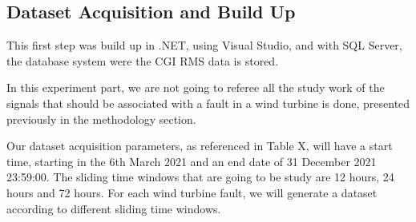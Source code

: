 \subsection{Dataset Acquisition and Build Up}
This first step was build up in .NET, using Visual Studio, and with SQL Server, the database system were the CGI RMS data is stored.

In this experiment part, we are not going to referee all the study work of the signals that should be associated with a fault in a wind turbine is done, presented previously in the methodology section.

Our dataset acquisition parameters, as referenced in Table X, will have a start time, starting in the 6th March 2021 and an end date of 31 December 2021 23:59:00. The sliding time windows that are going to be study are 12 hours, 24 hours and 72 hours.
For each wind turbine fault, we will generate a dataset according to different sliding time windows.



